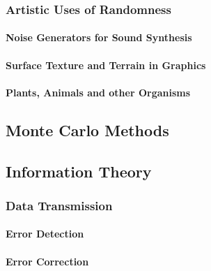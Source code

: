 \subsubsection{Artistic Uses of Randomness}

\paragraph{Noise Generators for Sound Synthesis}

\paragraph{Surface Texture and Terrain in Graphics}

\paragraph{Plants, Animals and other Organisms}




\subsection{Monte Carlo Methods}


\subsection{Information Theory}


\subsubsection{Data Transmission}

\paragraph{Error Detection}

\paragraph{Error Correction}

